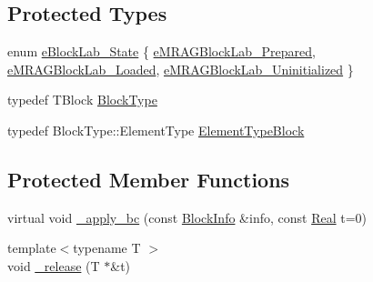\subsection*{Protected Types}
\begin{DoxyCompactItemize}
\item 
enum \hyperlink{class_block_lab_ad3a1e6e1a1002fb812d6853c8ac1ec9e}{e\+Block\+Lab\+\_\+\+State} \{ \hyperlink{class_block_lab_ad3a1e6e1a1002fb812d6853c8ac1ec9ea6c1a64be2e953c6093dab00aab32fe00}{e\+M\+R\+A\+G\+Block\+Lab\+\_\+\+Prepared}, 
\hyperlink{class_block_lab_ad3a1e6e1a1002fb812d6853c8ac1ec9eadaaa507dbe601b991a383e6a0701a09c}{e\+M\+R\+A\+G\+Block\+Lab\+\_\+\+Loaded}, 
\hyperlink{class_block_lab_ad3a1e6e1a1002fb812d6853c8ac1ec9ead9471f6585bd7cf7ddc9edad96e67362}{e\+M\+R\+A\+G\+Block\+Lab\+\_\+\+Uninitialized}
 \}
\item 
typedef T\+Block \hyperlink{class_block_lab_a745b3c9ac17f6743d11a7085196981a0}{Block\+Type}
\item 
typedef Block\+Type\+::\+Element\+Type \hyperlink{class_block_lab_ad547d74881a0d226a849e2051af6b26b}{Element\+Type\+Block}
\end{DoxyCompactItemize}
\subsection*{Protected Member Functions}
\begin{DoxyCompactItemize}
\item 
virtual void \hyperlink{class_block_lab_a669ac139b57be4967e5f43bc649a8520}{\+\_\+apply\+\_\+bc} (const \hyperlink{struct_block_info}{Block\+Info} \&info, const \hyperlink{_h_d_f5_dumper_8h_a445a5f0e2a34c9d97d69a3c2d1957907}{Real} t=0)
\item 
{\footnotesize template$<$typename T $>$ }\\void \hyperlink{class_block_lab_ab23c907953858c8b393a9910ecf5b1cf}{\+\_\+release} (T $\ast$\&t)
\end{DoxyCompactItemize}
